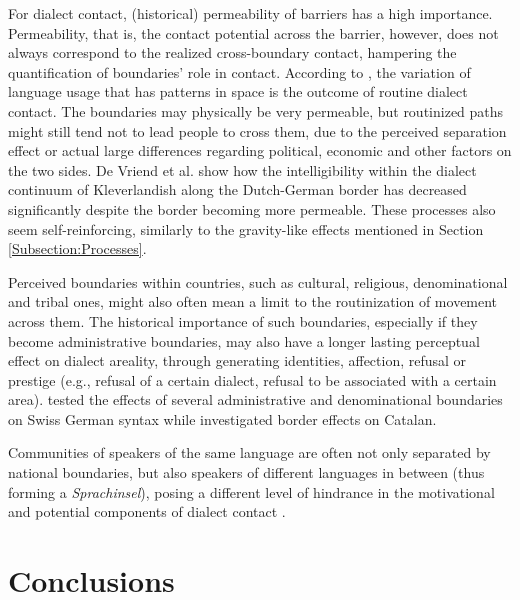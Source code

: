 \documentclass[output=paper]{langscibook}
\begin{document}
For dialect contact, (historical) permeability of barriers has a high importance.
Permeability, that is, the contact potential across the barrier, however, does not always correspond to the realized cross-boundary contact, hampering the quantification of boundaries' role in contact. According to \textcite{Britain2010a}, the variation of language usage that has patterns in space is the outcome of routine dialect contact. The boundaries may physically be very permeable, but routinized paths might still tend not to lead people to cross them, due to the perceived separation effect or actual large differences regarding political, economic and other factors on the two sides. De Vriend et al. \parencite*{deVriend2008} show how the intelligibility within the dialect continuum of Kleverlandish along the Dutch-German border has decreased significantly despite the border becoming more permeable. These processes also seem self-reinforcing, similarly to the gravity-like effects mentioned in Section \ref{Subsection:Processes}.

Perceived boundaries within countries, such as cultural, religious, denominational and tribal ones, might also often mean a limit to the routinization of movement across them. The historical importance of such boundaries, especially if they become administrative boundaries, may also have a longer lasting perceptual effect on dialect areality, through generating identities, affection, refusal or prestige (e.g., refusal of a certain dialect, refusal to be associated with a certain area). \textcite{Derungs2019} tested the effects of several administrative and denominational boundaries on Swiss German syntax while \textcite{Valls2013} investigated border effects on Catalan.

Communities of speakers of the same language are often not only separated by national boundaries, but also speakers of different languages in between (thus forming a \textit{Sprachinsel}), posing a different level of hindrance in the motivational and potential components of dialect contact \parencite[e.g., diaspora communities of any language around the world, such as Arabic speakers in Central Asia, see][]{Fischer1961}.

\section{Conclusions} 
\label{Section:Conclusion}
\end{document}
